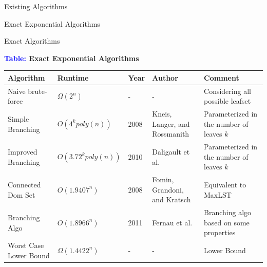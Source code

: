 \documentclass[xcolor=svgnames]{beamer}
\begin{document}
\begin{section}{Existing Algorithms}
    \begin{subsection}{Exact Exponential Algorithms}
        \begin{frame}{Exact Algorithms}
\begin{center}
    \textbf{\textcolor{blue}{Table:} Exact Exponential Algorithms}
\end{center}

\centering
\scriptsize
\begin{tabular}{m{2.5cm}m{1.75cm}m{0.75cm}m{1.9cm}m{2.3cm}}
\hline
\textbf{Algorithm}           & \textbf{Runtime}                & \textbf{Year} & \textbf{Author}                                & \textbf{Comment}                                            \\ \hline
Naive brute-force & $\Omega(2^n)$ & - & - & Considering all possible leafset \\ \hline
Simple Branching \cite{Kneis2008ANA}     & $O(4^kpoly(n))$           & 2008          & Kneis, Langer, and Rossmanith                  & Parameterized in the number of leaves $k$                   \\ \hline
Improved Branching \cite{daligault2010fpt}   & $O(3.72^kpoly(n))$        & 2010          & Daligault et al.                               & Parameterized in the number of leaves $k$                   \\ \hline
Connected Dom Set \cite{fomin2008solving}    & $O(1.9407^n)$                   & 2008          & Fomin, Grandoni, and Kratsch                   & Equivalent to MaxLST                                        \\ \hline
Branching Algo \cite{fernau2011exact}       & $O(1.8966^n)$                   & 2011          & Fernau et al.                                  & Branching algo based on some properties                     \\ \hline
Worst Case Lower Bound \cite{fernau2011exact} & $\Omega(1.4422^n)$              & -             & -                                              & Lower Bound                                                 \\ \hline
\end{tabular}
\end{frame}



\end{subsection}
\end{section}
\end{document}
